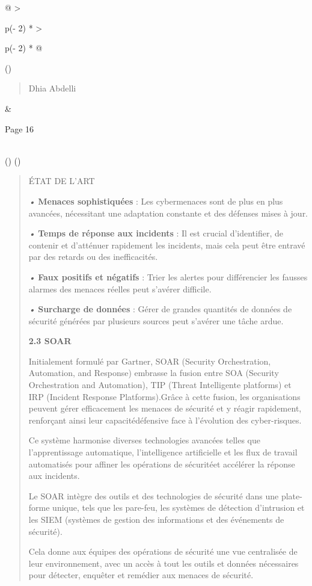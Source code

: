 \documentclass[
]{article}
\begin{document}
\begin{longtable}[]{@{}
  >{\raggedright\arraybackslash}p{(\columnwidth - 2\tabcolsep) * }
  >{\raggedright\arraybackslash}p{(\columnwidth - 2\tabcolsep) * }@{}}
\toprule()
\begin{minipage}[b]{\linewidth}\raggedright
\begin{quote}
Dhia Abdelli
\end{quote}
\end{minipage} & \begin{minipage}[b]{\linewidth}\raggedright
Page 16
\end{minipage} \\
\midrule()
\endhead
\bottomrule()
\end{longtable}

\begin{quote}
ÉTAT DE L'ART

\emph{•} \textbf{Menaces sophistiquées} : Les cybermenaces sont de plus
en plus avancées, nécessitant une adaptation constante et des défenses
mises à jour.

\emph{•} \textbf{Temps de réponse aux incidents} : Il est crucial
d'identifier, de contenir et d'atténuer rapidement les incidents, mais
cela peut être entravé par des retards ou des inefficacités.

\emph{•} \textbf{Faux positifs et négatifs} : Trier les alertes pour
différencier les fausses alarmes des menaces réelles peut s'avérer
difficile.

\emph{•} \textbf{Surcharge de données} : Gérer de grandes quantités de
données de sécurité générées par plusieurs sources peut s'avérer une
tâche ardue.

\textbf{2.3 SOAR}

Initialement formulé par Gartner, SOAR (Security Orchestration,
Automation, and Response) embrasse la fusion entre SOA (Security
Orchestration and Automation), TIP (Threat Intelligente platforms) et
IRP (Incident Response Platforms).Grâce à cette fusion, les
organisations peuvent gérer efficacement les menaces de sécurité et y
réagir rapidement, renforçant ainsi leur capacitédéfensive face à
l'évolution des cyber-risques.

Ce système harmonise diverses technologies avancées telles que
l'apprentissage automatique, l'intelligence artificielle et les flux de
travail automatisés pour affiner les opérations de sécuritéet accélérer
la réponse aux incidents.

Le SOAR intègre des outils et des technologies de sécurité dans une
plate-forme unique, tels que les pare-feu, les systèmes de détection
d'intrusion et les SIEM (systèmes de gestion des informations et des
événements de sécurité).

Cela donne aux équipes des opérations de sécurité une vue centralisée de
leur environnement, avec un accès à tout les outils et données
nécessaires pour détecter, enquêter et remédier aux menaces de sécurité.
\end{quote}
\end{document}
